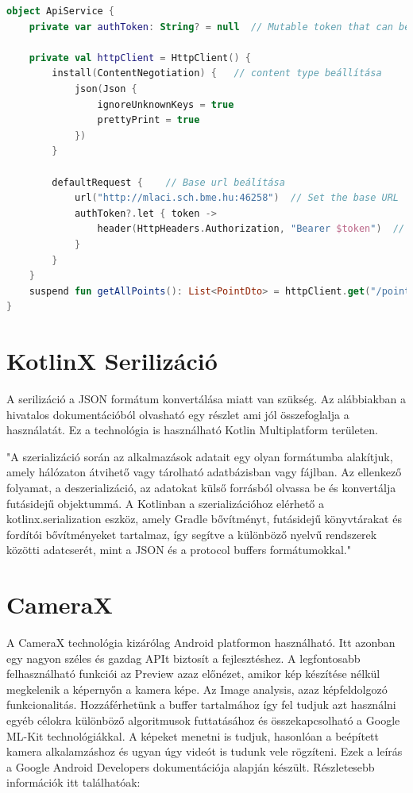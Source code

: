 \begin{lstlisting}[caption={Példa a Ktor használatára.}, label={lst:ktor}, language=Kotlin]
object ApiService {
    private var authToken: String? = null  // Mutable token that can be updated at runtime

    private val httpClient = HttpClient() {
        install(ContentNegotiation) {   // content type beállítása
            json(Json {
                ignoreUnknownKeys = true
                prettyPrint = true
            })
        }

        defaultRequest {    // Base url beálítása
            url("http://mlaci.sch.bme.hu:46258")  // Set the base URL   152.66.182.70:46258   192.168.1.17:46258
            authToken?.let { token ->
                header(HttpHeaders.Authorization, "Bearer $token")  // Add the Bearer token if it's not null
            }
        }
    }
    suspend fun getAllPoints(): List<PointDto> = httpClient.get("/point").body()    //végpontok
}
\end{lstlisting}

\section{KotlinX Serilizáció}
\label{sec:KotlinX}

A serilizáció a JSON formátum konvertálása miatt van szükség. Az alábbiakban a hivatalos dokumentációból olvasható egy részlet ami jól összefoglalja a használatát.
Ez a technológia is használható Kotlin Multiplatform területen.

"A szerializáció során az alkalmazások adatait egy olyan formátumba alakítjuk, amely hálózaton átvihető vagy tárolható adatbázisban vagy fájlban. Az ellenkező folyamat, a deszerializáció, az adatokat külső forrásból olvassa be és konvertálja futásidejű objektummá. A Kotlinban a szerializációhoz elérhető a kotlinx.serialization eszköz, amely Gradle bővítményt, futásidejű könyvtárakat és fordítói bővítményeket tartalmaz, így segítve a különböző nyelvű rendszerek közötti adatcserét, mint a JSON és a protocol buffers formátumokkal."\cite{Serialization}

\section{CameraX}

A CameraX technológia kizárólag Android platformon használható.
Itt azonban egy nagyon széles és gazdag APIt biztosít a fejlesztéshez.
A legfontosabb felhasználható funkciói az Preview azaz előnézet, amikor kép készítése nélkül megkelenik a képernyőn a kamera képe.
Az Image analysis, azaz képfeldolgozó funkcionalitás. Hozzáférhetünk a buffer tartalmához így fel tudjuk azt használni egyéb célokra különböző algoritmusok futtatásához és összekapcsolható a Google ML-Kit technológiákkal. 
A képeket menetni is tudjuk, hasonlóan a beépített kamera alkalamzáshoz és ugyan úgy videót is tudunk vele rögzíteni.
Ezek a leírás a Google Android Developers dokumentációja alapján készült. Részletesebb információk itt találhatóak: \cite{CameraX}

